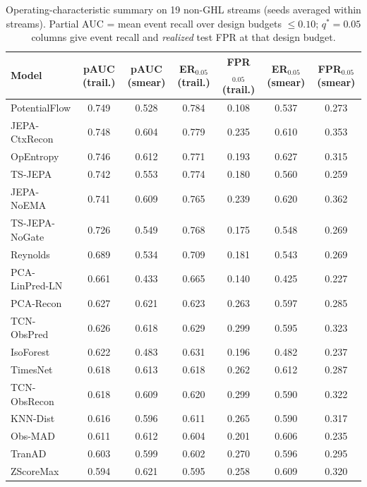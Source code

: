 \begin{table}[t]
\centering
\scriptsize
\caption{Operating-characteristic summary on 19 non-GHL streams (seeds averaged within streams). Partial AUC = mean event recall over design budgets $\le 0.10$; $q^*{=}0.05$ columns give event recall and \emph{realized} test FPR at that design budget.}\label{tab:operating_characteristic}
\scriptsize
\setlength{\tabcolsep}{2.5pt}
\begin{tabular}{@{}lcccccc@{}}
\toprule
Model & pAUC (trail.) & pAUC (smear) & ER$_{0.05}$ (trail.) & FPR$_{0.05}$ (trail.) & ER$_{0.05}$ (smear) & FPR$_{0.05}$ (smear) \\
\midrule
PotentialFlow & 0.749 & 0.528 & 0.784 & 0.108 & 0.537 & 0.273 \\
JEPA-CtxRecon & 0.748 & 0.604 & 0.779 & 0.235 & 0.610 & 0.353 \\
OpEntropy & 0.746 & 0.612 & 0.771 & 0.193 & 0.627 & 0.315 \\
TS-JEPA & 0.742 & 0.553 & 0.774 & 0.180 & 0.560 & 0.259 \\
JEPA-NoEMA & 0.741 & 0.609 & 0.765 & 0.239 & 0.620 & 0.362 \\
TS-JEPA-NoGate & 0.726 & 0.549 & 0.768 & 0.175 & 0.548 & 0.269 \\
Reynolds & 0.689 & 0.534 & 0.709 & 0.181 & 0.543 & 0.269 \\
PCA-LinPred-LN & 0.661 & 0.433 & 0.665 & 0.140 & 0.425 & 0.227 \\
PCA-Recon & 0.627 & 0.621 & 0.623 & 0.263 & 0.597 & 0.285 \\
TCN-ObsPred & 0.626 & 0.618 & 0.629 & 0.299 & 0.595 & 0.323 \\
IsoForest & 0.622 & 0.483 & 0.631 & 0.196 & 0.482 & 0.237 \\
TimesNet & 0.618 & 0.613 & 0.618 & 0.262 & 0.612 & 0.287 \\
TCN-ObsRecon & 0.618 & 0.609 & 0.620 & 0.299 & 0.590 & 0.322 \\
KNN-Dist & 0.616 & 0.596 & 0.611 & 0.265 & 0.590 & 0.317 \\
Obs-MAD & 0.611 & 0.612 & 0.604 & 0.201 & 0.606 & 0.235 \\
TranAD & 0.603 & 0.599 & 0.602 & 0.270 & 0.596 & 0.295 \\
ZScoreMax & 0.594 & 0.621 & 0.595 & 0.258 & 0.609 & 0.320 \\
\bottomrule
\end{tabular}
\end{table}

